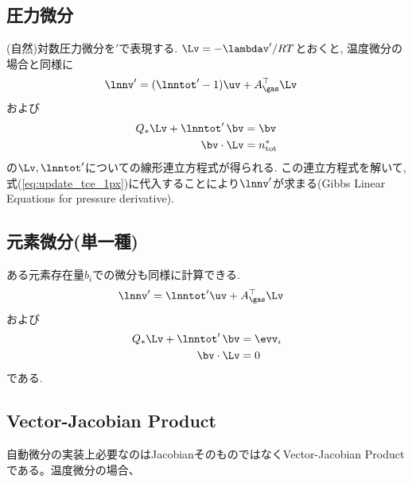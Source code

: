 \subsection*{圧力微分}
(自然)対数圧力微分を$\prime$で表現する. $\Lv = - \lambdav^\prime / RT$とおくと,
温度微分の場合と同様に
\begin{align}
\label{eq:update_tce_1px}
    \lnnv^\prime &= (\lnntot^\prime - 1) \uv + A_\gas^\top \Lv 
\end{align}
および
\begin{align}
\label{eq:update_tce_2px}
    Q_\ast \Lv +  \lnntot^\prime \, \bv   &= \bv \\
\label{eq:update_tce_3px}
    \bv \cdot \Lv &= n_\mathrm{tot}^\ast
\end{align}
の$\Lv, \lnntot^\prime$についての線形連立方程式が得られる. この連立方程式を解いて,式(\ref{eq:update_tce_1px})に代入することにより$\lnnv^\prime$が求まる(Gibbs Linear Equations for pressure derivative). 

\subsection*{元素微分(単一種)}
ある元素存在量$b_i$での微分も同様に計算できる. 
\begin{align}
\label{eq:update_tce_bi}
    \lnnv^\prime &= \lnntot^\prime \uv + A_\gas^\top \Lv 
\end{align}
および
\begin{align}
\label{eq:update_tce_2bi}
    Q_\ast \Lv +  \lnntot^\prime \, \bv   &= \evv_i \\
\label{eq:update_tce_3bi}
    \bv \cdot \Lv &= 0
\end{align}
である. 

\subsection{Vector-Jacobian Product}

自動微分の実装上必要なのはJacobianそのものではなくVector-Jacobian Productである。温度微分の場合、

